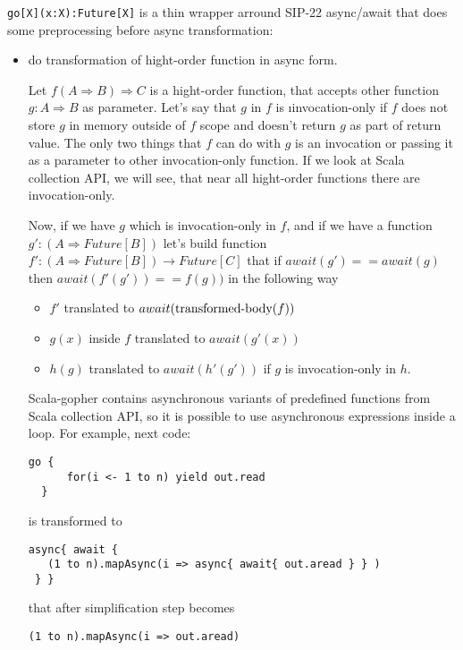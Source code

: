 \documentclass[12pt]{article}
\newcommand{\To}{\Rightarrow}
\begin{document}
 \verb|go[X](x:X):Future[X]| is a thin wrapper arround  SIP-22 async/await that does some preprocessing before async transformation:
\begin{itemize}
 \item do transformation of hight-order function in async form.


  Let $f(A \To B)\To C$ is a hight-order function, that accepts other function 
   $g:A \To B$ as parameter. 
  Let's say that $g$ in $f$ is {\i invocation-only } if $f$ does not store $g$ in memory outside of $f$ scope and doesn't return $g$ as part of return value. The only two things that $f$ can do with $g$ is an invocation or passing it as a parameter to other invocation-only function. If we look at Scala collection API, we will see, that near all hight-order functions there are invocation-only.

  Now, if we have $g$ which is invocation-only in $f$, and if we have a function $g' : (A \To Future[B])$ let's build function $f':(A\To Future[B])\to Future[C]$ that if $await(g')==await(g)$ then $await(f'(g'))==f(g))$ in the following way
  \begin{itemize}
    \item $f'$ translated to $await(\makebox{transformed-body}(f))$
    \item $g(x)$ inside $f$ translated to $await(g'(x))$
    \item $h(g)$ translated to $await(h'(g'))$ if $g$ is invocation-only in $h$.
  \end{itemize}

  Scala-gopher contains asynchronous variants of predefined functions from Scala collection API, so it is possible to use asynchronous expressions inside a loop. For example, next code:

\begin{Verbatim}[fontsize=\small]
  go { 
      for(i <- 1 to n) yield out.read
  }
\end{Verbatim}

  is transformed to

\begin{Verbatim}[fontsize=\small]
 async{ await {
   (1 to n).mapAsync(i => async{ await{ out.aread } } )
 } }
\end{Verbatim}

  that after simplification step becomes

\begin{Verbatim}[fontsize=\small]
   (1 to n).mapAsync(i => out.aread)
\end{Verbatim}


\end{itemize}
\end{document}
